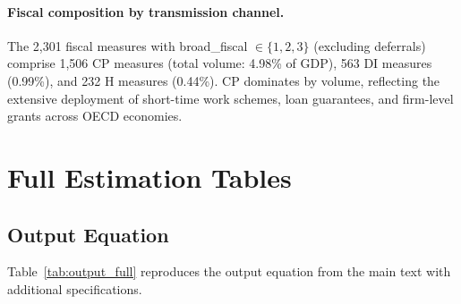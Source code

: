 \documentclass[12pt, a4paper]{article}
\begin{document}
\paragraph{Fiscal composition by transmission channel.} The 2,301 fiscal measures with broad\_fiscal $\in \{1, 2, 3\}$ (excluding deferrals) comprise 1,506 CP measures (total volume: 4.98\% of GDP), 563 DI measures (0.99\%), and 232 H measures (0.44\%). CP dominates by volume, reflecting the extensive deployment of short-time work schemes, loan guarantees, and firm-level grants across OECD economies.


\section{Full Estimation Tables}
\label{app:tables}

\subsection{Output Equation}

Table~\ref{tab:output_full} reproduces the output equation from the main text with additional specifications.
\end{document}
